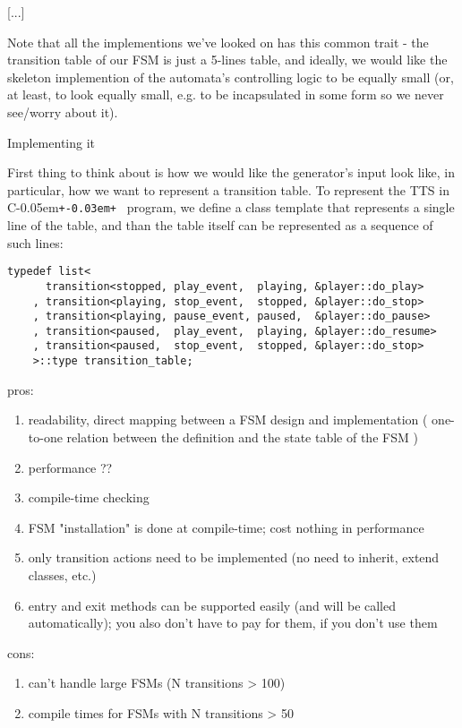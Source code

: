 \documentclass{netobjectdays}
\newcommand{\Cpp}{C\kern-0.05em\texttt{+\kern-0.03em+}%
}
\begin{document}
[...]

Note that all the implementions we've looked on has this common 
trait - the transition table of our FSM is just a 5-lines table, 
and ideally, we would like the skeleton implemention of the 
automata's controlling logic to be equally small (or, at least, 
to look equally small, e.g. to be incapsulated in some form so 
we never see/worry about it). 

Implementing it

First thing to think about is how we would like the generator's 
input look like, in particular, how we want to represent a 
transition table. To represent the TTS in \Cpp\ program, we define 
a  class template that represents a single line 
of the table, and than the table itself can be represented as a 
sequence of such lines:

{\footnotesize
\begin{verbatim}
typedef list<
      transition<stopped, play_event,  playing, &player::do_play>
    , transition<playing, stop_event,  stopped, &player::do_stop>
    , transition<playing, pause_event, paused,  &player::do_pause>
    , transition<paused,  play_event,  playing, &player::do_resume>
    , transition<paused,  stop_event,  stopped, &player::do_stop>
    >::type transition_table;
\end{verbatim}
}

pros:
\begin{enumerate}
\item readability, direct mapping between a FSM design and 
    implementation ( one-to-one relation between the 
    definition and the state table of the FSM )
\item performance ??
\item compile-time checking 
\item FSM "installation" is done at compile-time; cost 
    nothing in performance 
\item only transition actions need to be implemented 
    (no need to inherit, extend classes, etc.) 
\item entry and exit methods can be supported easily 
    (and will be called automatically); you also don't have 
    to pay for them, if you don't use them 
\end{enumerate}

cons:
\begin{enumerate}
\item can't handle large FSMs (N transitions > 100) 
\item compile times for FSMs with N transitions > 50 
\end{enumerate}
\end{document}
